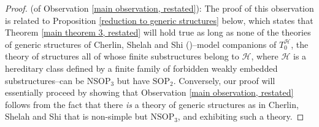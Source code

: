 \documentclass{amsart}
\theoremstyle{definition}
\theoremstyle{remark}
\numberwithin{equation}{section}
\begin{document}
\begin{proof}
    (of Observation \ref{main observation, restated}): The proof of this observation is related to Proposition \ref{reduction to generic structures} below, which states that Theorem \ref{main theorem 3, restated} will hold true as long as none of the theories of generic structures of Cherlin, Shelah and Shi (\cite{CSS99})--model companions of $T^{\mathcal{H}}_{0}$, the theory of structures all of whose finite substructures belong to $\mathcal{H}$, where $\mathcal{H}$ is a hereditary class defined by a finite family of forbidden weakly embedded substructures--can be $\mathrm{NSOP}_{3}$ but have $\mathrm{SOP}_{2}$. Conversely, our proof will essentially proceed by showing that Observation \ref{main observation, restated} follows from the fact that there \textit{is} a theory of generic structures as in Cherlin, Shelah and Shi that is non-simple but $\mathrm{NSOP}_{3}$, and exhibiting such a theory.


\end{proof}
\end{document}
